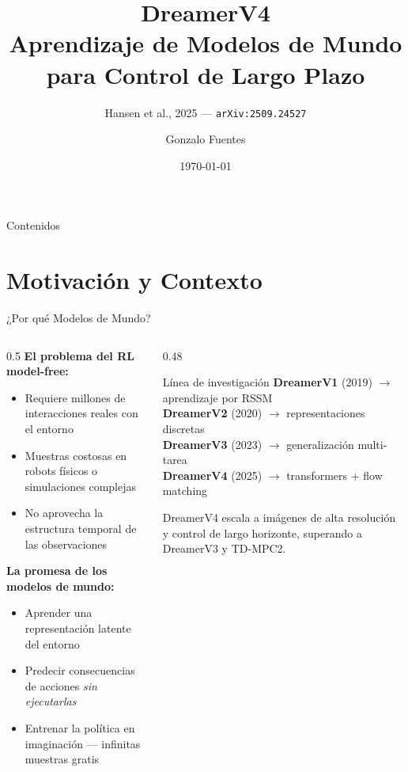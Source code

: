 \documentclass[aspectratio=169, 12pt]{beamer}
\title{\textbf{DreamerV4}\\[4pt]
       \large Aprendizaje de Modelos de Mundo para Control de Largo Plazo}
\subtitle{Hansen et al., 2025 — \texttt{arXiv:2509.24527}}
\author{Gonzalo Fuentes}
\institute{Magíster en Ciencias de la Computación}
\date{\today}
\begin{document}
\begin{frame}
\titlepage
\end{frame}

\begin{frame}{Contenidos}
\tableofcontents
\end{frame}

\section{Motivación y Contexto}

\begin{frame}{¿Por qué Modelos de Mundo?}
\begin{columns}[T]
  \begin{column}{0.5\textwidth}
    \textbf{El problema del RL model-free:}
    \begin{itemize}
      \item Requiere millones de interacciones reales con el entorno
      \item Muestras costosas en robots físicos o simulaciones complejas
      \item No aprovecha la estructura temporal de las observaciones
    \end{itemize}
    \vspace{8pt}
    \textbf{La promesa de los modelos de mundo:}
    \begin{itemize}
      \item Aprender una representación latente del entorno
      \item Predecir consecuencias de acciones \emph{sin ejecutarlas}
      \item Entrenar la política en \alert{imaginación} — infinitas muestras gratis
    \end{itemize}
  \end{column}
  \begin{column}{0.48\textwidth}
    \begin{block}{Línea de investigación}
      \centering
      \vspace{4pt}
      \textbf{DreamerV1} (2019) $\rightarrow$ aprendizaje por RSSM\\[4pt]
      \textbf{DreamerV2} (2020) $\rightarrow$ representaciones discretas\\[4pt]
      \textbf{DreamerV3} (2023) $\rightarrow$ generalización multi-tarea\\[4pt]
      \textbf{DreamerV4} (2025) $\rightarrow$ \alert{transformers + flow matching}
    \end{block}
    \vspace{8pt}
    \small DreamerV4 escala a imágenes de alta resolución y control de largo horizonte, superando a DreamerV3 y TD-MPC2.
  \end{column}
\end{columns}
\end{frame}
\end{document}

